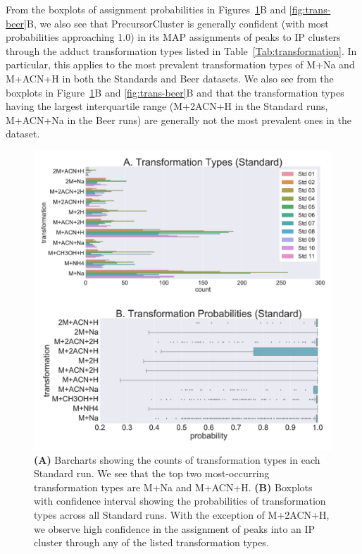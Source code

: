 From the boxplots of assignment probabilities in Figures~\ref{fig:trans-standards}B and \ref{fig:trans-beer}B, we also see that PrecursorCluster is generally confident (with most probabilities approaching 1.0) in its MAP assignments of peaks to IP clusters through the adduct transformation types listed in Table~\ref{Tab:transformation}. In particular, this applies to the most prevalent transformation types of M+Na and M+ACN+H in both the Standards and Beer datasets. We also see from the boxplots in Figure~\ref{fig:trans-standards}B and \ref{fig:trans-beer}B and that the transformation types having the largest interquartile range (M+2ACN+H in the Standard runs, M+ACN+Na in the Beer runs) are generally not the most prevalent ones in the dataset.

\begin{figure}[!htbp]
\centering
\includegraphics[width=1.0\linewidth]{05-precursor-cluster/figures/trans_Standard.pdf}
\caption{\label{fig:trans-standards} \textbf{(A)} Barcharts showing the counts of transformation types in each Standard run. We see that the top two most-occurring transformation types are M+Na and M+ACN+H. \textbf{(B)} Boxplots with confidence interval showing the probabilities of transformation types across all Standard runs. With the exception of M+2ACN+H, we observe high confidence in the assignment of peaks into an IP cluster through any of the listed transformation types.}
\end{figure}

